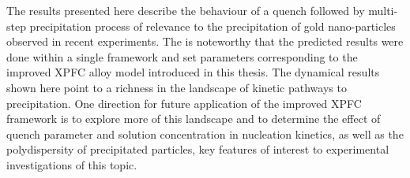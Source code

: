 \documentclass[showkeys, prb, reprint]{revtex4-1}
\begin{document}

The results presented here describe the behaviour of a quench followed by
multi-step precipitation process of relevance to the precipitation of gold
nano-particles observed in recent experiments. The is noteworthy that the
predicted results were done within a single framework and set parameters
corresponding to the improved XPFC alloy model introduced in this thesis. The
dynamical results shown here point to a richness in the landscape of kinetic
pathways to precipitation. One direction for future application of the improved
XPFC framework is to explore more of this landscape and to determine the effect
of quench parameter and solution concentration in nucleation kinetics, as well
as the polydispersity of precipitated particles, key features of interest to
experimental investigations of this topic.



\end{document}
